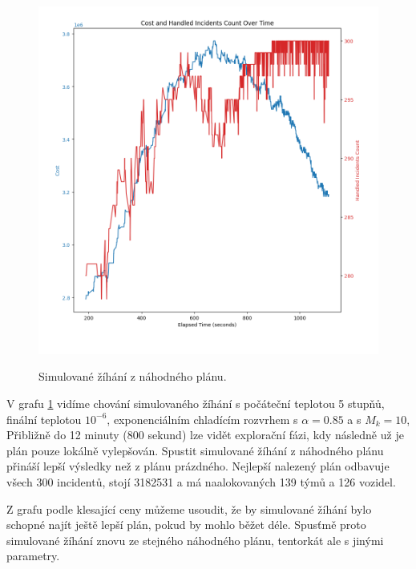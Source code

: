 \begin{figure}[H]
  \caption{Simulované žíhání z náhodného plánu.}
  \includegraphics[width=\textwidth]{img/plots/sa_random_85.png}
  \centering
  \label{img:sa_random}
\end{figure}

V grafu \ref{img:sa_random} vidíme chování simulovaného žíhání
s počáteční teplotou 5 stupňů, finální teplotou $10^{-6}$, exponenciálním chladícím rozvrhem s $\alpha = 0.85$ a s $M_k = 10$,
Přibližně do 12 minuty (800 sekund) lze vidět explorační fázi, kdy následně už je plán pouze lokálně vylepšován. 
Spustit simulované žíhání z náhodného plánu přináší lepší výsledky než z plánu prázdného.
Nejlepší nalezený plán odbavuje všech 300 incidentů, stojí 3182531 a má naalokovaných 139 týmů a 126 vozidel.

Z grafu podle klesající ceny můžeme usoudit, že by simulované žíhání bylo schopné najít ještě lepší plán, pokud by mohlo běžet déle.
Spusťmě proto simulované žíhání znovu ze stejného náhodného plánu, tentorkát ale s jinými parametry.

